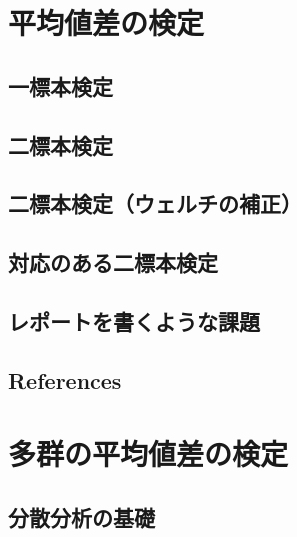 \documentclass[
  a4paper,
]{ltjsbook}
\begin{document}

\chapter{平均値差の検定}\label{ux5e73ux5747ux5024ux5deeux306eux691cux5b9a}

\section{一標本検定}\label{ux4e00ux6a19ux672cux691cux5b9a}

\section{二標本検定}\label{ux4e8cux6a19ux672cux691cux5b9a}

\section{二標本検定（ウェルチの補正）}\label{ux4e8cux6a19ux672cux691cux5b9aux30a6ux30a7ux30ebux30c1ux306eux88dcux6b63}

\section{対応のある二標本検定}\label{ux5bfeux5fdcux306eux3042ux308bux4e8cux6a19ux672cux691cux5b9a}

\section{レポートを書くような課題}\label{ux30ecux30ddux30fcux30c8ux3092ux66f8ux304fux3088ux3046ux306aux8ab2ux984c}

\section{References}\label{references-7}



\chapter{多群の平均値差の検定}\label{ux591aux7fa4ux306eux5e73ux5747ux5024ux5deeux306eux691cux5b9a}

\section{分散分析の基礎}\label{ux5206ux6563ux5206ux6790ux306eux57faux790e}
\end{document}

